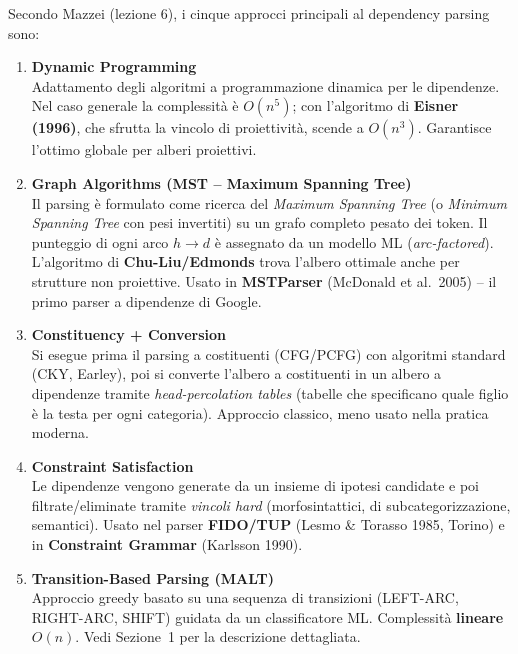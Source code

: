 \documentclass[12pt,a4paper]{article}
\begin{document}
Secondo Mazzei (lezione 6), i cinque approcci principali al dependency parsing sono:

\begin{enumerate}[leftmargin=1.5em, label=\textbf{\arabic*.}]

  \item \textbf{Dynamic Programming}\\
    Adattamento degli algoritmi a programmazione dinamica per le dipendenze. Nel caso generale la complessità è $O(n^5)$; con l'algoritmo di \textbf{Eisner (1996)}, che sfrutta la vincolo di proiettività, scende a $O(n^3)$. Garantisce l'ottimo globale per alberi proiettivi.

  \item \textbf{Graph Algorithms (MST -- Maximum Spanning Tree)}\\
    Il parsing è formulato come ricerca del \emph{Maximum Spanning Tree} (o \emph{Minimum Spanning Tree} con pesi invertiti) su un grafo completo pesato dei token. Il punteggio di ogni arco $h \to d$ è assegnato da un modello ML (\emph{arc-factored}). L'algoritmo di \textbf{Chu-Liu/Edmonds} trova l'albero ottimale anche per strutture non proiettive. Usato in \textbf{MSTParser} (McDonald et al.\ 2005) -- il primo parser a dipendenze di Google.

  \item \textbf{Constituency + Conversion}\\
    Si esegue prima il parsing a costituenti (CFG/PCFG) con algoritmi standard (CKY, Earley), poi si converte l'albero a costituenti in un albero a dipendenze tramite \emph{head-percolation tables} (tabelle che specificano quale figlio è la testa per ogni categoria). Approccio classico, meno usato nella pratica moderna.

  \item \textbf{Constraint Satisfaction}\\
    Le dipendenze vengono generate da un insieme di ipotesi candidate e poi filtrate/eliminate tramite \emph{vincoli hard} (morfosintattici, di subcategorizzazione, semantici). Usato nel parser \textbf{FIDO/TUP} (Lesmo \& Torasso 1985, Torino) e in \textbf{Constraint Grammar} (Karlsson 1990).

  \item \textbf{Transition-Based Parsing (MALT)}\\
    Approccio greedy basato su una sequenza di transizioni (LEFT-ARC, RIGHT-ARC, SHIFT) guidata da un classificatore ML. Complessità \textbf{lineare} $O(n)$. Vedi Sezione~1 per la descrizione dettagliata.

\end{enumerate}
\end{document}
